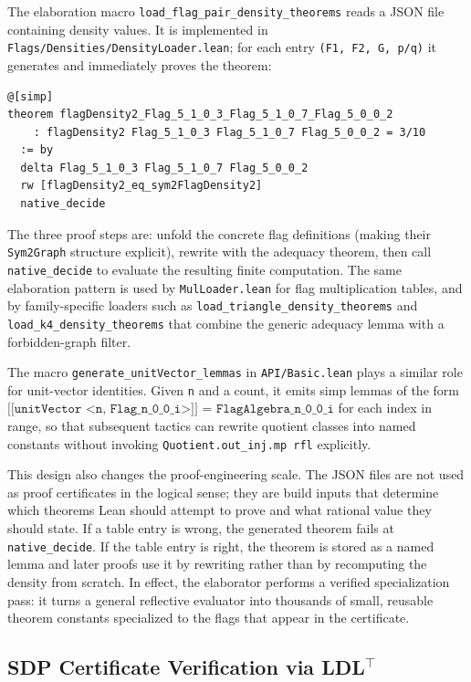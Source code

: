 \documentclass{article}
\newcommand{\lean}[1]{\texttt{#1}}
\begin{document}
The elaboration macro \lean{load\_flag\_pair\_density\_theorems} reads a JSON
file containing density values.  It is implemented in
\lean{Flags/Densities/DensityLoader.lean}; for each entry
\lean{(F1, F2, G, p/q)} it generates and immediately proves the theorem:
\begin{lstlisting}
@[simp]
theorem flagDensity2_Flag_5_1_0_3_Flag_5_1_0_7_Flag_5_0_0_2
    : flagDensity2 Flag_5_1_0_3 Flag_5_1_0_7 Flag_5_0_0_2 = 3/10
  := by
  delta Flag_5_1_0_3 Flag_5_1_0_7 Flag_5_0_0_2
  rw [flagDensity2_eq_sym2FlagDensity2]
  native_decide
\end{lstlisting}
The three proof steps are: unfold the concrete flag definitions (making their
\lean{Sym2Graph} structure explicit), rewrite with the adequacy theorem, then
call \lean{native\_decide} to evaluate the resulting finite computation.  The
same elaboration pattern is used by \lean{MulLoader.lean} for flag
multiplication tables, and by family-specific loaders such as
\lean{load\_triangle\_density\_theorems} and
\lean{load\_k4\_density\_theorems} that combine the generic adequacy lemma
with a forbidden-graph filter.

The macro \lean{generate\_unitVector\_lemmas} in \lean{API/Basic.lean} plays
a similar role for unit-vector identities.  Given \lean{n} and a count, it
emits simp lemmas of the form
$\lean{[[unitVector <n, Flag\_n\_0\_0\_i>]] = FlagAlgebra\_n\_0\_0\_i}$ for
each index in range, so that subsequent tactics can rewrite quotient classes
into named constants without invoking \lean{Quotient.out\_inj.mp rfl}
explicitly.

This design also changes the proof-engineering scale.  The JSON files are not
used as proof certificates in the logical sense; they are build inputs that
determine which theorems Lean should attempt to prove and what rational value
they should state.  If a table entry is wrong, the generated theorem fails at
\lean{native\_decide}.  If the table entry is right, the theorem is stored as
a named lemma and later proofs use it by rewriting rather than by recomputing
the density from scratch.  In effect, the elaborator performs a verified
specialization pass: it turns a general reflective evaluator into thousands
of small, reusable theorem constants specialized to the flags that appear in
the certificate.

\subsection{SDP Certificate Verification via \texorpdfstring{LDL$^\top$}{LDL\string^T}}
\label{sec:sdp}
\end{document}
